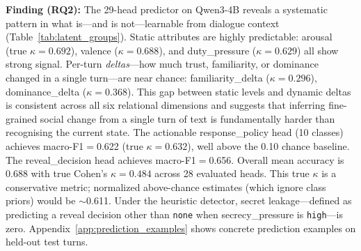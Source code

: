 \documentclass[11pt]{article}
\begin{document}
\begin{table}[t]
\centering
\caption{Per-group latent state prediction metrics (Qwen3-4B, 28 single-label heads evaluated on validation set; dialogue act is multi-label, excluded here). All $\kappa$ values are true Cohen's $\kappa$ computed from confusion matrices.}
\label{tab:latent_groups}
\small
{}
\end{table}

\textbf{Finding (RQ2):} The 29-head predictor on Qwen3-4B reveals a systematic pattern in what is---and is not---learnable from dialogue context (Table~\ref{tab:latent_groups}).
Static attributes are highly predictable: arousal (true $\kappa{=}0.692$), valence ($\kappa{=}0.688$), and duty\_pressure ($\kappa{=}0.629$) all show strong signal.
Per-turn \textit{deltas}---how much trust, familiarity, or dominance changed in a single turn---are near chance: familiarity\_delta ($\kappa{=}0.296$), dominance\_delta ($\kappa{=}0.368$).
This gap between static levels and dynamic deltas is consistent across all six relational dimensions and suggests that inferring fine-grained social change from a single turn of text is fundamentally harder than recognising the current state.
The actionable response\_policy head (10 classes) achieves macro-F1$=$0.622 (true $\kappa{=}0.632$), well above the 0.10 chance baseline.
The reveal\_decision head achieves macro-F1$=$0.656.
Overall mean accuracy is 0.688 with true Cohen's $\kappa{=}0.484$ across 28 evaluated heads.
This true $\kappa$ is a conservative metric; normalized above-chance estimates (which ignore class priors) would be $\sim$0.611.
Under the heuristic detector, secret leakage---defined as predicting a reveal decision other than \texttt{none} when secrecy\_pressure is \texttt{high}---is zero.
Appendix~\ref{app:prediction_examples} shows concrete prediction examples on held-out test turns.
\end{document}
